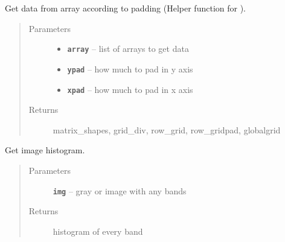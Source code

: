 \documentclass[letterpaper,10pt,english]{sphinxmanual}
\begin{document}
\begin{fulllineitems}
\label{RRtoolbox.lib.arrayops:RRtoolbox.lib.arrayops.basic.getdataVH}
Get data from array according to padding (Helper function for {\hyperref[RRtoolbox.lib.arrayops:RRtoolbox.lib.arrayops.basic.padVH]{\emph{}}}).
\begin{quote}\begin{description}
\item[{Parameters}] \leavevmode\begin{itemize}
\item {} 
\textbf{\texttt{array}} -- list of arrays to get data

\item {} 
\textbf{\texttt{ypad}} -- how much to pad in y axis

\item {} 
\textbf{\texttt{xpad}} -- how much to pad in x axis

\end{itemize}

\item[{Returns}] \leavevmode
matrix\_shapes, grid\_div, row\_grid, row\_gridpad, globalgrid

\end{description}\end{quote}

\end{fulllineitems}


\begin{fulllineitems}
\label{RRtoolbox.lib.arrayops:RRtoolbox.lib.arrayops.basic.histogram}
Get image histogram.
\begin{quote}\begin{description}
\item[{Parameters}] \leavevmode
\textbf{\texttt{img}} -- gray or image with any bands

\item[{Returns}] \leavevmode
histogram of every band

\end{description}\end{quote}

\end{fulllineitems}
\end{document}
